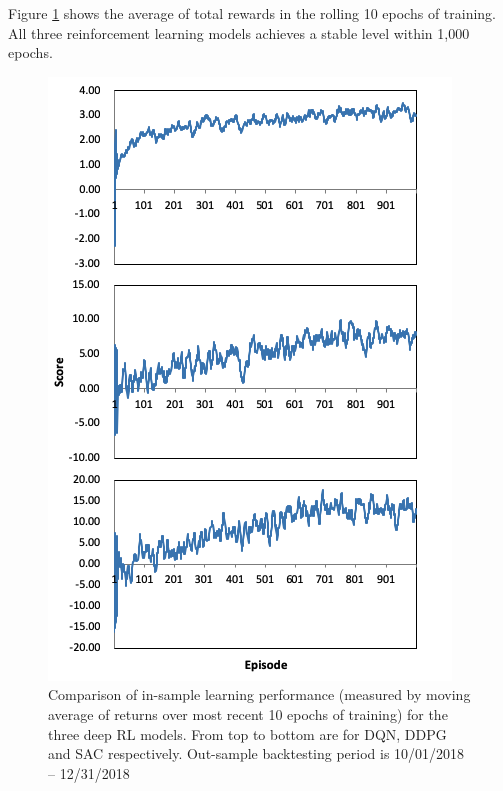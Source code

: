 \documentclass{article}
\begin{document}
Figure \ref{fig:perf_compare} shows the average of total rewards in the rolling 10 epochs of training. All three reinforcement learning models achieves a stable level within 1,000 epochs.
\begin{figure}[h]
	\includegraphics[width=\linewidth]{in_sample_perf_compare.png}
	\caption{Comparison of in-sample learning performance (measured by moving average of returns over most recent 10 epochs of training) for the three deep RL models. From top to bottom are for DQN, DDPG and SAC respectively. Out-sample backtesting period is 10/01/2018 – 12/31/2018}
	\label{fig:perf_compare}
\end{figure}
\end{document}
